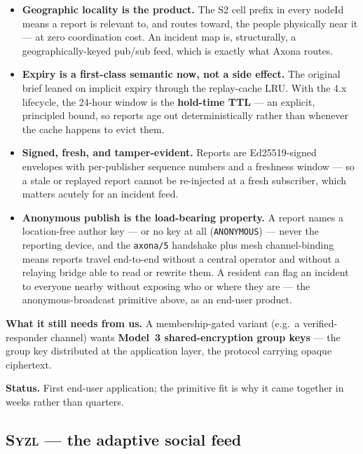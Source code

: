 \documentclass[nobib]{tufte-handout}
\begin{document}
\begin{itemize}
\item \textbf{Geographic locality is the product.} The S2 cell prefix
in every nodeId means a report is relevant to, and routes toward, the
people physically near it --- at zero coordination cost. An incident map
is, structurally, a geographically-keyed pub/sub feed, which is exactly
what Axona routes.
\item \textbf{Expiry is a first-class semantic now, not a side
effect.} The original brief leaned on implicit expiry through the
replay-cache LRU. With the 4.x lifecycle, the 24-hour window is the
\textbf{hold-time TTL} --- an explicit, principled bound, so reports age
out deterministically rather than whenever the cache happens to evict
them.
\item \textbf{Signed, fresh, and tamper-evident.} Reports are
Ed25519-signed envelopes with per-publisher sequence numbers and a
freshness window --- so a stale or replayed report cannot be re-injected
at a fresh subscriber, which matters acutely for an incident feed.
\item \textbf{Anonymous publish is the load-bearing property.} A report
names a location-free author key --- or no key at all
(\texttt{ANONYMOUS}) --- never the reporting device, and the
\texttt{axona/5} handshake plus mesh channel-binding means reports travel
end-to-end without a central operator and without a relaying bridge able
to read or rewrite them. A resident can flag an incident to everyone
nearby without exposing who or where they are --- the anonymous-broadcast
primitive above, as an end-user product.
\end{itemize}

\textbf{What it still needs from us.} A membership-gated variant
(e.g.\ a verified-responder channel) wants \textbf{Model~3
shared-encryption group keys} --- the group key distributed at the
application layer, the protocol carrying opaque
ciphertext.

\textbf{Status.} First end-user application; the primitive fit is why
it came together in weeks rather than quarters.

\subsection{\textsc{Syzl} --- the adaptive social feed}
\end{document}
